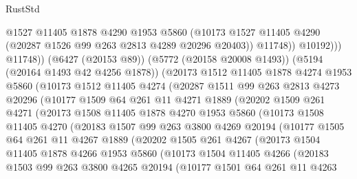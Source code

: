 \begin{lexlean}{RustStd}
\begin{coremodule}
{\begin{coremodule}
{{{{{{{{{{{{{{{{{{{{{{{{{{{{{                    @1527
                    @11405
                    @1878
                    @4290
                    @1953
                    @5860
                    (@10173 @1527 @11405 @4290 (@20287 @1526 @99 @263 @2813 @4289 @20296 @20403))
                    @11748))
                @10192)))
          @11748))
      (@6427 (@20153 @89))
      (@5772 (@20158 @20008 @1493))
      (@5194 (@20164 @1493 @42 @4256 @1878))
      (@20173
        @1512
        @11405
        @1878
        @4274
        @1953
        @5860
        (@10173
          @1512
          @11405
          @4274
          (@20287
            @1511
            @99
            @263
            @2813
            @4273
            @20296
            (@10177
              @1509
              @64
              @261
              @11
              @4271
              @1889
              (@20202
                @1509
                @261
                @4271
                (@20173
                  @1508
                  @11405
                  @1878
                  @4270
                  @1953
                  @5860
                  (@10173
                    @1508
                    @11405
                    @4270
                    (@20183
                      @1507
                      @99
                      @263
                      @3800
                      @4269
                      @20194
                      (@10177
                        @1505
                        @64
                        @261
                        @11
                        @4267
                        @1889
                        (@20202
                          @1505
                          @261
                          @4267
                          (@20173
                            @1504
                            @11405
                            @1878
                            @4266
                            @1953
                            @5860
                            (@10173
                              @1504
                              @11405
                              @4266
                              (@20183
                                @1503
                                @99
                                @263
                                @3800
                                @4265
                                @20194
                                (@10177
                                  @1501
                                  @64
                                  @261
                                  @11
                                  @4263
}}}}}}}}}}}}}}}}}}}}}}}}}}}}}
\end{coremodule}}
\end{coremodule}
\end{lexlean}
